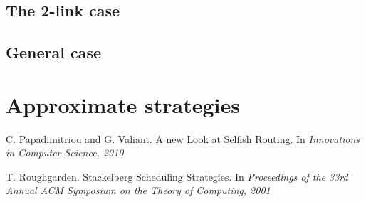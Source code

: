 \subsection{The 2-link case}

\subsection{General case}



\section{Approximate strategies}


\begin{thebibliography}{8}

  C. Papadimitriou and G. Valiant. A new Look at Selfish Routing. In
  \emph{Innovations in Computer Science, 2010}.

	T. Roughgarden. Stackelberg Scheduling Strategies. In \emph{Proceedings of the 33rd Annual ACM Symposium on the Theory of Computing, 2001}

\end{thebibliography}

